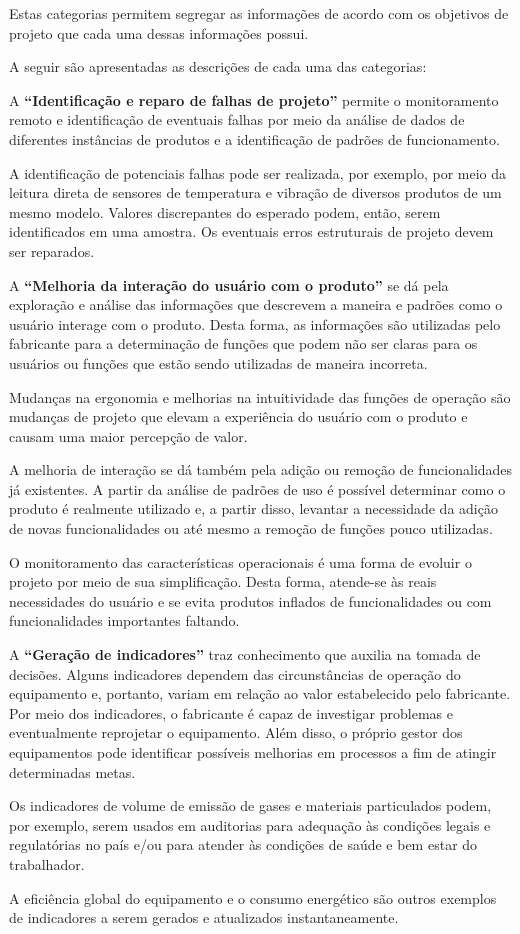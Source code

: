 Estas categorias permitem segregar as informações de acordo com os objetivos de projeto que cada uma dessas informações possui.

A seguir são apresentadas as descrições de cada uma das categorias:

A \textbf{``Identificação e reparo de falhas de projeto''} permite o monitoramento remoto e identificação de eventuais falhas por meio da análise de dados de diferentes instâncias de produtos e a identificação de padrões de funcionamento.

A identificação de potenciais falhas pode ser realizada, por exemplo, por meio da leitura direta de sensores de temperatura e vibração de diversos produtos de um mesmo modelo. Valores discrepantes do esperado podem, então, serem identificados em uma amostra. Os eventuais erros estruturais de projeto devem ser reparados.

A \textbf{``Melhoria da interação do usuário com o produto''} se dá pela exploração e análise das informações que descrevem a maneira e padrões como o usuário interage com o produto. Desta forma, as informações são utilizadas pelo fabricante para a determinação de funções que podem não ser claras para os usuários ou funções que estão sendo utilizadas de maneira incorreta.

Mudanças na ergonomia e melhorias na intuitividade das funções de operação são mudanças de projeto que elevam a experiência do usuário com o produto e causam uma maior percepção de valor.

A melhoria de interação se dá também pela adição ou remoção de funcionalidades já existentes. A partir da análise de padrões de uso é possível determinar como o produto é realmente utilizado e, a partir disso, levantar a necessidade da adição de novas funcionalidades ou até mesmo a remoção de funções pouco utilizadas.

O monitoramento das características operacionais é uma forma de evoluir o projeto por meio de sua simplificação. Desta forma, atende-se às reais necessidades do usuário e se evita produtos inflados de funcionalidades ou com funcionalidades importantes faltando.

A \textbf{``Geração de indicadores''} traz conhecimento que auxilia na tomada de decisões. Alguns indicadores dependem das circunstâncias de operação do equipamento e, portanto, variam em relação ao valor estabelecido pelo fabricante. Por meio dos indicadores, o fabricante é capaz de investigar problemas e eventualmente reprojetar o equipamento. Além disso, o próprio gestor dos equipamentos pode identificar possíveis melhorias em processos a fim de atingir determinadas metas.

Os indicadores de volume de emissão de gases e materiais particulados podem, por exemplo, serem usados em auditorias para adequação às condições legais e regulatórias no país e/ou para atender às condições de saúde e bem estar do trabalhador.

A eficiência global do equipamento e o consumo energético são outros exemplos de indicadores a serem gerados e atualizados instantaneamente.
